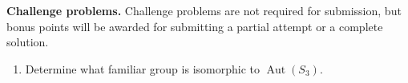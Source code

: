 \documentclass{article}
\theoremstyle{definition}
\numberwithin{equation}{section}
\renewcommand\>{\rangle}
\newcommand\<{\langle}
\newcommand\0{\mathbf{0}}
\DeclareMathOperator\Aut{Aut} %
\begin{document}
\bigskip
\noindent
\textbf{Challenge problems.}
Challenge problems are not required for submission, but bonus points will be awarded for submitting a partial attempt or a complete solution.  

\begin{enumerate}[(C1)]
\item 
Determine what familiar group is isomorphic to $\Aut(S_3)$.  

\end{enumerate}
\end{document}
